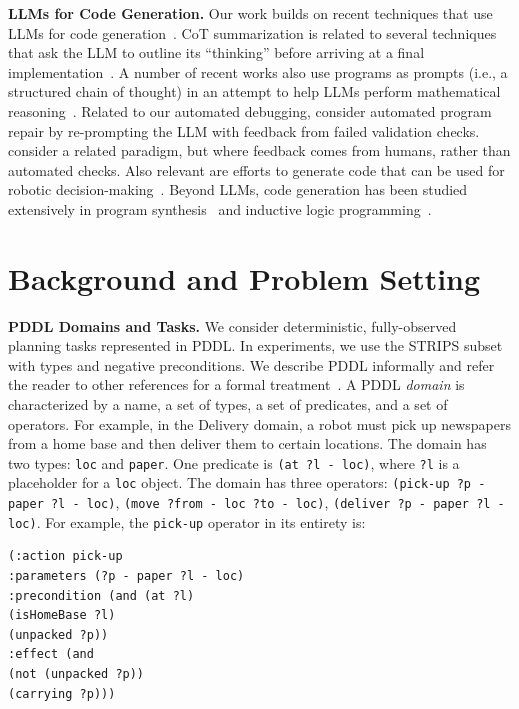 \documentclass[letterpaper]{article} %
\begin{document}
\textbf{LLMs for Code Generation.}
Our work builds on recent techniques that use LLMs for code generation~\cite{chen2021evaluating,nijkamp2023codegen}.
CoT summarization is related to several techniques that ask the LLM to outline its ``thinking'' before arriving at a final implementation~\cite{wei2022chain,jiang2023self,zheng2023outline}.
A number of recent works also use programs as prompts (i.e.,  a structured chain of thought) in an attempt to help LLMs perform mathematical reasoning~\cite{gao2022pal,imani2023mathprompter}.
Related to our automated debugging, \citet{xia2023conversational,chen2023teaching} consider automated program repair by re-prompting the LLM with feedback from failed validation checks.
\citet{chen2023improving} consider a related paradigm, but where feedback comes from humans, rather than automated checks.
Also relevant are efforts to generate code that can be used for robotic decision-making~\cite{liang2022code,singh2022progprompt}.
Beyond LLMs, code generation has been studied extensively in program synthesis~\cite{alur2013syntax,gulwani2017program} and inductive logic programming~\cite{muggleton1991inductive,cropper2022inductive}.

\section{Background and Problem Setting}

\textbf{PDDL Domains and Tasks.}
We consider deterministic, fully-observed planning tasks represented in PDDL.
In experiments, we use the STRIPS subset with types and negative preconditions.
We describe PDDL informally and refer the reader to other references for a formal treatment~\cite{mcdermott-aimag2000}.
A PDDL \emph{domain} is characterized by a name, a set of types, a set of predicates, and a set of operators.
For example, in the Delivery domain, a robot must pick up newspapers from a home base and then deliver them to certain locations.
The domain has two types: \texttt{loc} and \texttt{paper}.
One predicate is \texttt{(at ?l - loc)}, where \texttt{?l} is a placeholder for a \texttt{loc} object.
The domain has three operators: \texttt{(pick-up ?p - paper ?l - loc)}, \texttt{(move ?from - loc ?to - loc)}, \texttt{(deliver ?p - paper ?l - loc)}.
For example, the \texttt{pick-up} operator in its entirety is:
{\footnotesize
\begin{verbatim}
(:action pick-up
:parameters (?p - paper ?l - loc)
:precondition (and (at ?l)
(isHomeBase ?l)
(unpacked ?p))
:effect (and
(not (unpacked ?p))
(carrying ?p)))
\end{verbatim}
}
\end{document}
